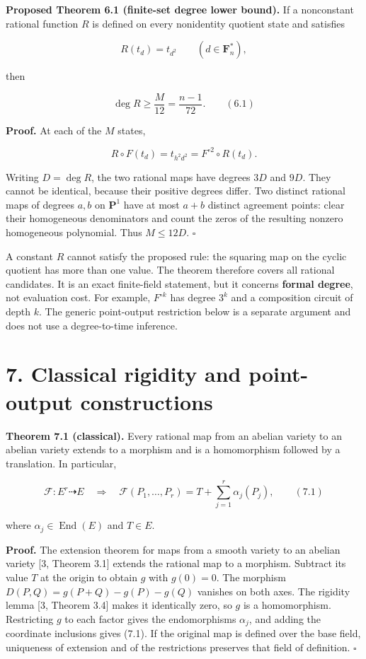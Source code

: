 \documentclass[
  11pt,
  a4paper,
]{article}
\begin{document}
\textbf{Proposed Theorem 6.1 (finite-set degree lower bound).} If a
nonconstant rational function \(R\) is defined on every nonidentity
quotient state and satisfies

\[
R(t_d)=t_{d^2}\qquad(d\in\mathbf F_n^*),
\]

then

\[
\deg R\geq\frac{M}{12}=\frac{n-1}{72}. \qquad (6.1)
\]

\textbf{Proof.} At each of the \(M\) states,

\[
R\circ F(t_d)=t_{h^2d^2}=F^{\circ2}\circ R(t_d).
\]

Writing \(D=\deg R\), the two rational maps have degrees \(3D\) and
\(9D\). They cannot be identical, because their positive degrees differ.
Two distinct rational maps of degrees \(a,b\) on \(\mathbf P^1\) have at
most \(a+b\) distinct agreement points: clear their homogeneous
denominators and count the zeros of the resulting nonzero homogeneous
polynomial. Thus \(M\leq12D\). \(\square\)

A constant \(R\) cannot satisfy the proposed rule: the squaring map on
the cyclic quotient has more than one value. The theorem therefore
covers all rational candidates. It is an exact finite-field statement,
but it concerns \textbf{formal degree}, not evaluation cost. For
example, \(F^{\circ k}\) has degree \(3^k\) and a composition circuit of
depth \(k\). The generic point-output restriction below is a separate
argument and does not use a degree-to-time inference.

\section{7. Classical rigidity and point-output
constructions}\label{classical-rigidity-and-point-output-constructions}

\textbf{Theorem 7.1 (classical).} Every rational map from an abelian
variety to an abelian variety extends to a morphism and is a
homomorphism followed by a translation. In particular,

\[
\mathcal F:E^r\dashrightarrow E\quad\Longrightarrow\quad
\mathcal F(P_1,\ldots,P_r)=T+\sum_{j=1}^r\alpha_j(P_j), \qquad (7.1)
\]

where \(\alpha_j\in\operatorname{End}(E)\) and \(T\in E\).

\textbf{Proof.} The extension theorem for maps from a smooth variety to
an abelian variety {[}3, Theorem 3.1{]} extends the rational map to a
morphism. Subtract its value \(T\) at the origin to obtain \(g\) with
\(g(0)=0\). The morphism \(D(P,Q)=g(P+Q)-g(P)-g(Q)\) vanishes on both
axes. The rigidity lemma {[}3, Theorem 3.4{]} makes it identically zero,
so \(g\) is a homomorphism. Restricting \(g\) to each factor gives the
endomorphisms \(\alpha_j\), and adding the coordinate inclusions gives
(7.1). If the original map is defined over the base field, uniqueness of
extension and of the restrictions preserves that field of definition.
\(\square\)
\end{document}
